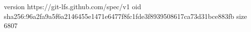 version https://git-lfs.github.com/spec/v1
oid sha256:96a2fa9a5f6a2146455e1471e6477f8fc1fde3f8939508617ca73d31bce883fb
size 6807
